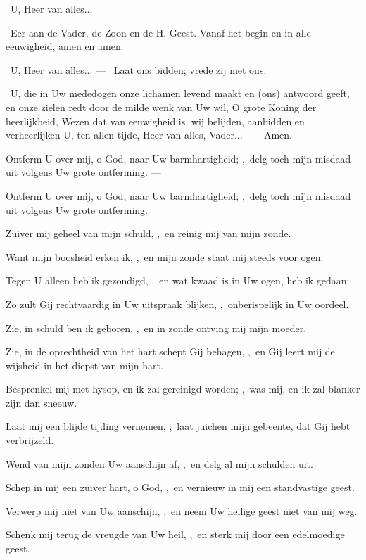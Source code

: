 \documentclass[12pt,twoside,a5paper]{article}
\begin{document}
\rr\ U, Heer van alles...

\dd\ Eer aan de Vader, de Zoon en de H. Geest. Vanaf het begin en in alle eeuwigheid, amen en amen.

\rr\ U, Heer van alles... --- \dd\ Laat ons bidden; vrede zij met ons.

\cc\ U, die in Uw mededogen onze lichamen levend maakt en (ons) antwoord geeft, en onze zielen redt door de milde wenk van Uw wil, O grote Koning der heerlijkheid, Wezen dat van eeuwigheid is, wij belijden, aanbidden en verheerlijken U, ten allen tijde, Heer van alles, Vader... --- \rr\ Amen.

\begin{halfparskip}
   Ontferm U over mij, o God, naar Uw barmhartigheid; \sep\ delg toch mijn misdaad uit volgens Uw grote ontferming. --- 

  Ontferm U over mij, o God, naar Uw barmhartigheid; \sep\ delg toch mijn misdaad uit volgens Uw grote ontferming.

  Zuiver mij geheel van mijn schuld, \sep\ en reinig mij van mijn zonde.

  Want mijn boosheid erken ik, \sep\ en mijn zonde staat mij steeds voor ogen.

  Tegen U alleen heb ik gezondigd, \sep\ en wat kwaad is in Uw ogen, heb ik gedaan:

  Zo zult Gij rechtvaardig in Uw uitspraak blijken, \sep\ onberispelijk in Uw oordeel.

  Zie, in schuld ben ik geboren, \sep\ en in zonde ontving mij mijn moeder.

  Zie, in de oprechtheid van het hart schept Gij behagen, \sep\ en Gij leert mij de wijsheid in het diepst van mijn hart.

  Besprenkel mij met hysop, en ik zal gereinigd worden; \sep\ was mij, en ik zal blanker zijn dan sneeuw.

  Laat mij een blijde tijding vernemen, \sep\ laat juichen mijn gebeente, dat Gij hebt verbrijzeld.

  Wend van mijn zonden Uw aanschijn af, \sep\ en delg al mijn schulden uit.

  Schep in mij een zuiver hart, o God, \sep\ en vernieuw in mij een standvastige geest.

  Verwerp mij niet van Uw aanschijn, \sep\ en neem Uw heilige geest niet van mij weg.

  Schenk mij terug de vreugde van Uw heil, \sep\ en sterk mij door een edelmoedige geest.


\end{halfparskip}
\end{document}
